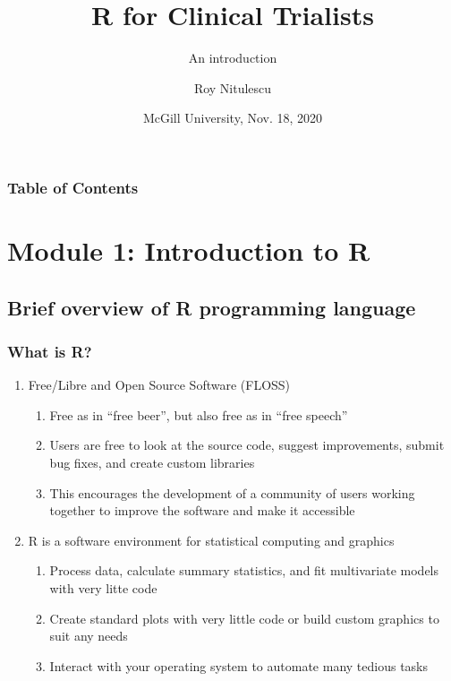 \documentclass{beamer}
\title{R for Clinical Trialists}
\subtitle{An introduction}
\author{Roy Nitulescu\inst{1}}
\institute
{
    \inst{1}%
    CITADEL\\
    CR-CHUM
}
\date{McGill University, Nov. 18, 2020}
\begin{document}

\frame{\titlepage}

\begin{frame}
    \frametitle{Table of Contents}
    \tableofcontents
\end{frame}



\section{Module 1: Introduction to R}

\subsection{Brief overview of R programming language}

\begin{frame}
    \frametitle{What is R?}
    \begin{enumerate}
      \item Free/Libre and Open Source Software (FLOSS)
      \begin{enumerate}
        \item Free as in ``free beer'', but also free as in ``free speech''
        \item Users are free to look at the source code, suggest improvements, submit bug fixes, and create custom libraries
        \item This encourages the development of a community of users working together to improve the software and make it accessible
      \end{enumerate}
      \item R is a software environment for statistical computing and graphics
      \begin{enumerate}
        \item Process data, calculate summary statistics, and fit multivariate models with very litte code
        \item Create standard plots with very little code or build custom graphics to suit any needs
        \item Interact with your operating system to automate many tedious tasks
      \end{enumerate}
    \end{enumerate}
\end{frame}
\end{document}
